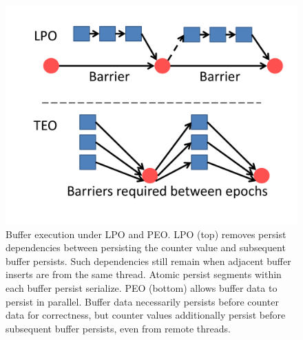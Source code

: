 \begin{figure}
\centering
\includegraphics[width=\textwidth]{PMC_patterns/buffer_PEO_LPO.pdf}
\caption{Buffer execution under LPO and PEO.  LPO (top) removes persist dependencies between persisting the counter value and subsequent buffer persists.  Such dependencies still remain when adjacent buffer inserts are from the same thread.  Atomic persist segments within each buffer persist serialize.  PEO (bottom) allows buffer data to persist in parallel.  Buffer data necessarily persists before counter data for correctness, but counter values additionally persist before subsequent buffer persists, even from remote threads.}
\label{figure::buffer_PEO_LPO}
\end{figure}
